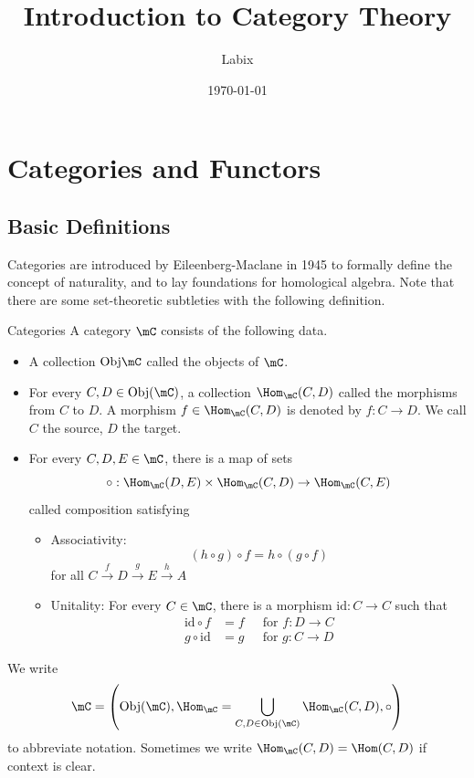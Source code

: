 \documentclass[a4paper]{article}
\title{Introduction to Category Theory}
\author{Labix}
\date{\today}
\begin{document}
\maketitle
\begin{abstract}
\end{abstract}
\pagebreak
\tableofcontents
\pagebreak

\section{Categories and Functors}
\subsection{Basic Definitions}
Categories are introduced by Eileenberg-Maclane in 1945 to formally define the concept of naturality, and to lay foundations for homological algebra. Note that there are some set-theoretic subtleties with the following definition. 

\begin{defn}{Categories}{} A category $\mC$ consists of the following data. 
\begin{itemize}
\item A collection $\text{Obj}\mC$ called the objects of $\mC$. 
\item For every $C,D\in\text{Obj}(\mC)$, a collection $\Hom_\mC(C,D)$ called the morphisms from $C$ to $D$. A morphism $f\in\Hom_\mC(C,D)$ is denoted by $f:C\to D$. We call $C$ the source, $D$ the target. 
\item For every $C,D,E\in\mC$, there is a map of sets $$\circ:\Hom_\mC(D,E)\times\Hom_\mC(C,D)\to\Hom_\mC(C,E)$$ called composition satisfying
\begin{itemize}
\item Associativity: $$(h\circ g)\circ f=h\circ(g\circ f)$$ for all $C\overset{f}{\rightarrow}D\overset{g}{\rightarrow}E\overset{h}{\rightarrow}A$
\item Unitality: For every $C\in\mC$, there is a morphism $\text{id}:C\to C$ such that 
\begin{align*}
\text{id}\circ f&=f\;\;\;\;\text{ for }f:D\to C\\
g\circ\text{id}&=g\;\;\;\;\text{ for }g:C\to D
\end{align*}
\end{itemize}
\end{itemize}
\end{defn}

We write $$\mC=\left(\text{Obj}(\mC),\Hom_\mC=\bigcup_{C,D\in\text{Obj}(\mC)}\Hom_\mC(C,D),\circ\right)$$ to abbreviate notation. Sometimes we write $\Hom_\mC(C,D)=\Hom(C,D)$ if context is clear. 
\end{document}
